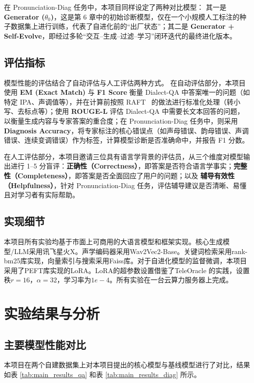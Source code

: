 在 Pronunciation-Diag 任务中，本项目同样设定了两种对比模型：  
其一是 \textbf{Generator ($\theta_0$)}，这是第 6 章中的初始诊断模型，仅在一个小规模人工标注的种子数据集上进行训练，代表了自进化前的“出厂状态”；其二是 \textbf{Generator + Self-Evolve}，即经过多轮“交互–生成–过滤–学习”闭环迭代的最终进化版本。

\subsection{评估指标}

模型性能的评估结合了自动评估与人工评估两种方式。  
在自动评估部分，本项目使用 \textbf{EM (Exact Match)} 与 \textbf{F1 Score} 衡量 Dialect-QA 中答案唯一的问题（如特定 IPA、声调值等），并在计算前按照 RAFT~\cite{zhang2024raft} 的做法进行标准化处理（转小写、去标点等）；使用 \textbf{ROUGE-L} 评估 Dialect-QA 中需要长文本回答的问题，以衡量生成内容与专家答案的重合度；在 Pronunciation-Diag 任务中，则采用 \textbf{Diagnosis Accuracy}，将专家标注的核心错误点（如声母错误、韵母错误、声调错误、连续变调错误）作为标签，计算模型诊断是否准确命中，并报告 F1 分数。

在人工评估部分，本项目邀请三位具有语言学背景的评估员，从三个维度对模型输出进行 1–5 分盲评：\textbf{正确性（Correctness）}，即答案是否符合语言学事实；\textbf{完整性（Completeness）}，即答案是否全面回应了用户的问题；以及 \textbf{辅导有效性（Helpfulness）}，针对 Pronunciation-Diag 任务，评估辅导建议是否清晰、易懂且对学习者有实际帮助。
\subsection{实现细节}
本项目所有实验均基于市面上可商用的大语言模型和框架实现。核心生成模型/LLM采用讯飞星火X。声学编码器采用Wav2Vec2-Base。关键词检索采用rank-bm25库实现，向量索引与搜索采用Faiss库。对于自进化模型的监督微调，本项目采用了PEFT库实现的LoRA。LoRA的超参数设置借鉴了TeleOracle 的实践，设置秩$r=16$，$\alpha=32$，学习率为$1e-4$。所有实验在一台云算力服务器上完成。

\section{实验结果与分析}

\subsection{主要模型性能对比}
本项目在两个自建数据集上对本项目提出的核心模型与基线模型进行了对比，结果如表 \ref{tab:main_results_qa} 和表 \ref{tab:main_results_diag} 所示。

